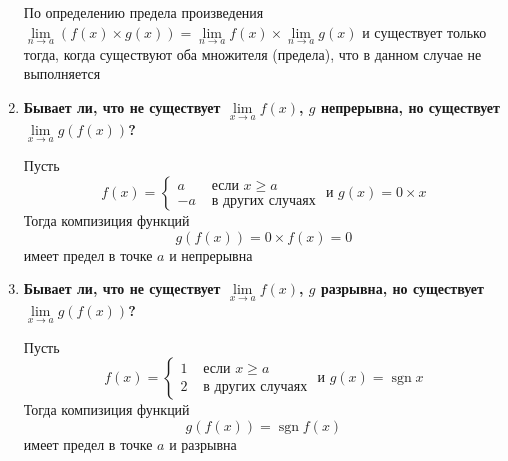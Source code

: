 \documentclass[a4paper,12pt]{article}
\DeclareMathOperator{\sgn}{sgn}
\begin{document}
\begin{enumerate}
{      По определению предела произведения $\lim\limits_{n \rightarrow a}(f(x) \times g(x)) = \lim\limits_{n \rightarrow a}f(x) \times \lim\limits_{n \rightarrow a}g(x)$
      и существует только тогда, когда существуют оба множителя (предела), что в данном случае не выполняется
    }
    \item {
      \textbf{Бывает ли, что не существует $\lim\limits_{x\rightarrow a}f(x)$, $g$ непрерывна, но существует $\lim\limits_{x \rightarrow a}g(f(x))$?}

      Пусть \begin{equation}
        f(x) = \begin{cases}
          a &\text{ если } x \geq a \\
          -a &\text{ в других случаях}
        \end{cases} \text{ и }
        g(x) = 0 \times x
      \end{equation} Тогда компизиция функций
      \begin{equation}
        g(f(x)) = 0 \times f(x) = 0
      \end{equation}
      имеет предел в точке $a$ и непрерывна
    }
    \item {
      \textbf{Бывает ли, что не существует $\lim\limits_{x\rightarrow a}f(x)$, $g$ разрывна, но существует $\lim\limits_{x \rightarrow a}g(f(x))$?}

      Пусть \begin{equation}
        f(x) = \begin{cases}
          1 &\text{ если } x \geq a \\
          2 &\text{ в других случаях}
        \end{cases} \text{ и }
        g(x) = \sgn x
      \end{equation} Тогда компизиция функций
      \begin{equation}
        g(f(x)) = \sgn f(x)
      \end{equation}
      имеет предел в точке $a$ и разрывна
    }
  \end{enumerate}
\end{document}

